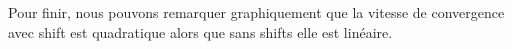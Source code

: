 \documentclass[11pt]{article}
\begin{document}
\begin{figure}[H]
	
	
	
	
\end{figure}

Pour finir, nous pouvons remarquer graphiquement que la vitesse de convergence avec shift est quadratique alors que sans shifts elle est linéaire.

\begin{figure}[H]
	
\end{figure}
\end{document}
